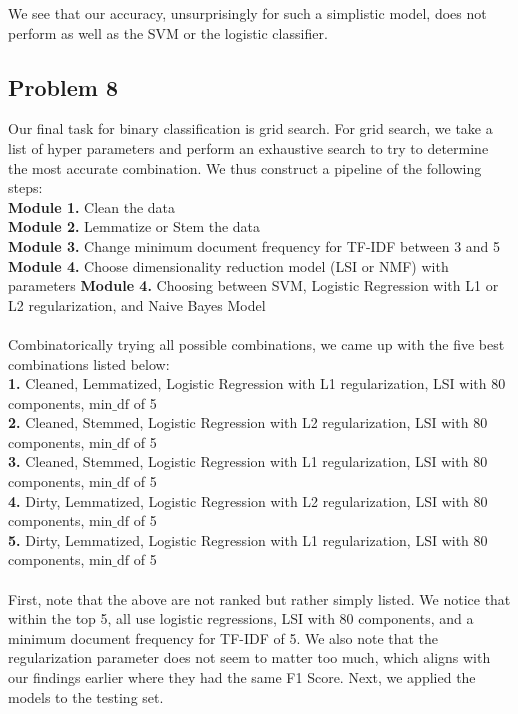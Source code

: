 \documentclass[11pt]{article}
\begin{document}
\begin{multicols}{2}
We see that our accuracy, unsurprisingly for such a simplistic model, does not perform as well as the SVM or the logistic classifier. 

\subsection*{Problem 8}
Our final task for binary classification is grid search. For grid search, we take a list of hyper parameters and perform an exhaustive search to try to determine the most accurate combination. We thus construct a pipeline of the following steps:\\
\textbf{Module 1.} Clean the data \\
\textbf{Module 2.} Lemmatize or Stem the data \\
\textbf{Module 3.} Change minimum document frequency for TF-IDF between 3 and 5 \\
\textbf{Module 4.} Choose dimensionality reduction model (LSI or NMF) with parameters
\textbf{Module 4.} Choosing between SVM, Logistic Regression with L1 or L2 regularization, and Naive Bayes Model
\\\\
Combinatorically trying all possible combinations, we came up with the five best combinations listed below:\\
\textbf{1.} Cleaned, Lemmatized, Logistic Regression with L1 regularization, LSI with 80 components, $\text{min\_df}$ of 5 \\
\textbf{2.} Cleaned, Stemmed, Logistic Regression with L2 regularization, LSI with 80 components, $\text{min\_df}$ of 5\\
\textbf{3.} Cleaned, Stemmed, Logistic Regression with L1 regularization, LSI with 80 components, $\text{min\_df}$ of 5\\
\textbf{4.} Dirty, Lemmatized, Logistic Regression with L2 regularization, LSI with 80 components, $\text{min\_df}$ of 5 \\
\textbf{5.} Dirty, Lemmatized, Logistic Regression with L1 regularization, LSI with 80 components, $\text{min\_df}$ of 5 \\\\
First, note that the above are not ranked but rather simply listed. We notice that within the top 5, all use logistic regressions, LSI with 80 components, and a minimum document frequency for TF-IDF of 5. We also note that the regularization parameter does not seem to matter too much, which aligns with our findings earlier where they had the same F1 Score.  Next, we applied the models to the testing set. \\\\


\end{multicols}
\end{document}
